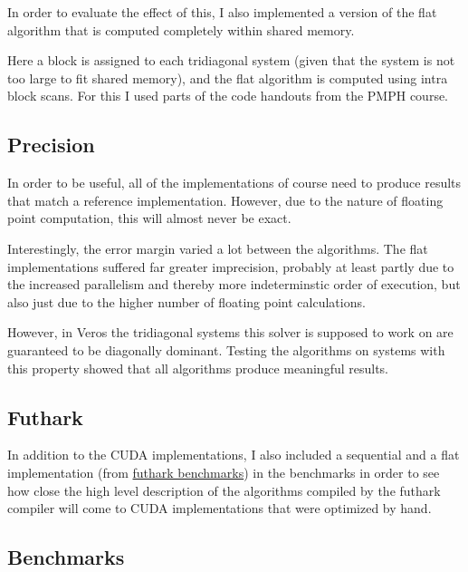 \documentclass[a4paper,oneside]{memoir}
\begin{document}
In order to evaluate the effect of this, I also implemented a version of the flat algorithm that is computed completely within shared memory.

Here a block is assigned to each tridiagonal system (given that the system is not too large to fit shared memory), and the flat algorithm is computed using intra block scans. For this I used parts of the code handouts from the PMPH course.


\subsection{Precision}
In order to be useful, all of the implementations of course need to produce results that match a reference implementation. However, due to the nature of floating point computation, this will almost never be exact.

Interestingly, the error margin varied a lot between the algorithms. The flat implementations suffered far greater imprecision, probably at least partly due to the increased parallelism and thereby more indeterminstic order of execution, but also just due to the higher number of floating point calculations.

However, in Veros the tridiagonal systems this solver is supposed to work on are guaranteed to be diagonally dominant. Testing the algorithms on systems with this property showed that all algorithms produce meaningful results.
\subsection{Futhark}
In addition to the CUDA implementations, I also included a sequential and a flat implementation (from \href{https://github.com/diku-dk/futhark-benchmarks/blob/bf5112d0841866dc7370586f2e2a7b48467d2d97/finpar/LocVolCalib.fut}{futhark benchmarks}) in the benchmarks in order to see how close the high level description of the algorithms compiled by the futhark compiler will come to CUDA implementations that were optimized by hand.

\subsection{Benchmarks}

\vspace*{\fill}
\end{document}
